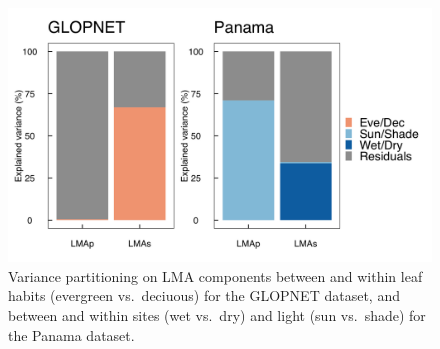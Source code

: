 \documentclass[
  12pt,
]{article}
\providecommand{\DIFaddbeginFL}{} %
\providecommand{\DIFaddendFL}{} %
\providecommand{\DIFdelbeginFL}{} %
\providecommand{\DIFdelendFL}{} %
\newcommand{\DIFscaledelfig}{0.5}
\newlength{\DIFdelgraphicswidth} %
\newlength{\DIFdelgraphicsheight} %
\newcommand{\DIFaddincludegraphics}[2][]{{\color{blue}\fbox{\DIFOincludegraphics[#1]{#2}}}} %
\newcommand{\DIFdelincludegraphics}[2][]{%
\sbox{\DIFdelgraphicsbox}{\DIFOincludegraphics[#1]{#2}}%
\settoboxwidth{\DIFdelgraphicswidth}{\DIFdelgraphicsbox} %
\settoboxtotalheight{\DIFdelgraphicsheight}{\DIFdelgraphicsbox} %
\scalebox{\DIFscaledelfig}{%
\parbox[b]{\DIFdelgraphicswidth}{\usebox{\DIFdelgraphicsbox}\\[-\baselineskip] \rule{\DIFdelgraphicswidth}{0em}}\llap{\resizebox{\DIFdelgraphicswidth}{\DIFdelgraphicsheight}{%
\setlength{\unitlength}{\DIFdelgraphicswidth}%
\begin{picture}(1,1)%
\thicklines\linethickness{2pt} %
{\color[rgb]{1,0,0}\put(0,0){\framebox(1,1){}}}%
{\color[rgb]{1,0,0}\put(0,0){\line( 1,1){1}}}%
{\color[rgb]{1,0,0}\put(0,1){\line(1,-1){1}}}%
\end{picture}%
}\hspace*{3pt}}} %
} %
\DeclareRobustCommand{\DIFaddbeginFL}{\DIFOaddbeginFL \let\includegraphics\DIFaddincludegraphics} %
\DeclareRobustCommand{\DIFaddendFL}{\DIFOaddendFL \let\includegraphics\DIFOincludegraphics} %
\DeclareRobustCommand{\DIFdelbeginFL}{\DIFOdelbeginFL \let\includegraphics\DIFdelincludegraphics} %
\DeclareRobustCommand{\DIFdelendFL}{\DIFOaddendFL \let\includegraphics\DIFOincludegraphics} %
\begin{document}
\newpage

\begin{figure}
\DIFdelbeginFL %
\DIFdelendFL \DIFaddbeginFL \hypertarget{fig:vpart}{%
\centering
\includegraphics{../figs/vpart.png}
\caption{Variance partitioning on LMA components between and within leaf habits (evergreen vs.~deciuous) for the GLOPNET dataset, and between and within sites (wet vs.~dry) and light (sun vs.~shade) for the Panama dataset.}\label{fig:vpart}
}
\DIFaddendFL \end{figure}

\newpage
\end{document}
